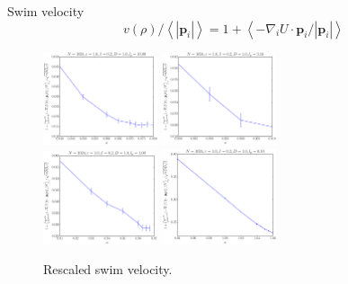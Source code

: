 \documentclass{beamer}
\begin{document}
{\begin{frame}[noframenumbering]{Swim velocity}
\begin{equation}
v(\rho)/\left<|\boldsymbol{p}_i|\right> = 1 + \left<-\nabla_i U \cdot \boldsymbol{p}_i/|\boldsymbol{p}_i|\right>
\end{equation}

\begin{figure}
\centering
\includegraphics[width=0.30\textwidth]{fo_No1024_Tl1000_Rj1000.eps}
\includegraphics[width=0.30\textwidth]{fo_No1024_Tl1000_Rk1000.eps}\\
\includegraphics[width=0.30\textwidth]{fo_No1024_Tl1000_Rl1000.eps}
\includegraphics[width=0.30\textwidth]{fo_No1024_Tl1000_Rn1000.eps}
\caption{Rescaled swim velocity.}
\end{figure}

\vspace{-10pt}

\end{frame}

}
\end{document}
